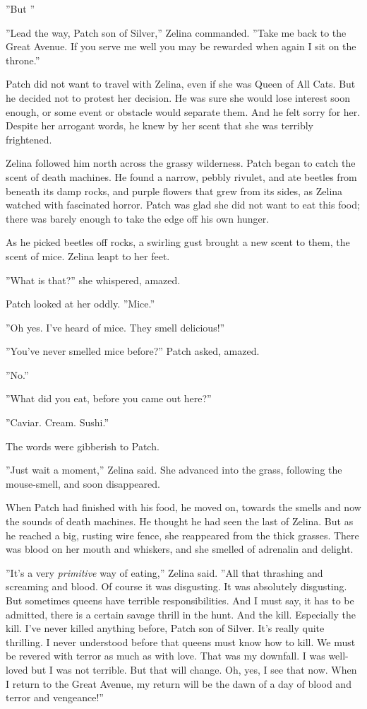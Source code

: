 \documentclass[12pt]{book}
\begin{document}
''But %
''\par
''Lead the way, Patch son of Silver,'' Zelina commanded. ''Take me back to the Great Avenue. If you serve me well you may be rewarded when again I sit on the throne.''\par
 Patch did not want to travel with Zelina, even if she was Queen of All Cats. But he decided not to protest her decision. He was sure she would lose interest soon enough, or some event or obstacle would separate them. And he felt sorry for her. Despite her arrogant words, he knew by her scent that she was terribly frightened.\par
 Zelina followed him north across the grassy wilderness. Patch began to catch the scent of death machines. He found a narrow, pebbly rivulet, and ate beetles from beneath its damp rocks, and purple flowers that grew from its sides, as Zelina watched with fascinated horror. Patch was glad she did not want to eat this food; there was barely enough to take the edge off his own hunger.\par
 As he picked beetles off rocks, a swirling gust brought a new scent to them, the scent of mice. Zelina leapt to her feet.\par
 ''What is that?'' she whispered, amazed.\par
 Patch looked at her oddly. ''Mice.''\par
 ''Oh yes. I've heard of mice. They smell delicious!''\par
 ''You've never smelled mice before?'' Patch asked, amazed.\par
 ''No.''\par
 ''What did you eat, before you came out here?''\par
 ''Caviar. Cream. Sushi.''\par
The words were gibberish to Patch.\par
''Just wait a moment,'' Zelina said. She advanced into the grass, following the mouse-smell, and soon disappeared.\par
 When Patch had finished with his food, he moved on, towards the smells and now the sounds of death machines. He thought he had seen the last of Zelina. But as he reached a big, rusting wire fence, she reappeared from the thick grasses. There was blood on her mouth and whiskers, and she smelled of adrenalin and delight.\par
 ''It's a very {\it primitive} way of eating,'' Zelina said. ''All that thrashing and screaming and blood. Of course it was disgusting. It was absolutely disgusting. But sometimes queens have terrible responsibilities. And I must say, it has to be admitted, there is a certain savage thrill in the hunt. And the kill. Especially the kill. I've never killed anything before, Patch son of Silver. It's really quite thrilling. I never understood before that queens must know how to kill. We must be revered with terror as much as with love. That was my downfall. I was well-loved but I was not terrible. But that will change. Oh, yes, I see that now. When I return to the Great Avenue, my return will be the dawn of a day of blood and terror and vengeance!''\par
\end{document}
